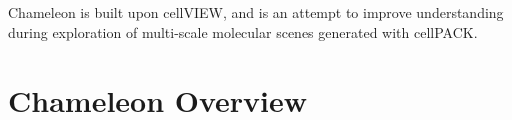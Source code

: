 \documentclass{egpubl}
\begin{document}
	Chameleon is built upon cellVIEW, and is an attempt to improve understanding during exploration of multi-scale molecular scenes generated with cellPACK.
	
%	


	

		
	\section{Chameleon Overview}
	\label{Overview}
	
\end{document}
